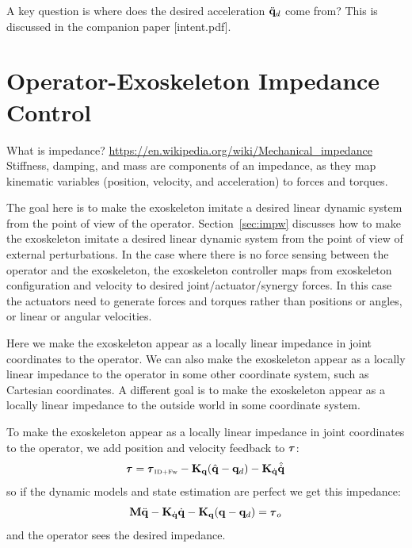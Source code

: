 \documentclass[letterpaper,12pt,fullpage]{article}
\newcommand{\invdynw}{{\mbox {\tiny ID+Fw}}}
\begin{document}
A key question is where does the desired acceleration $\ddot{{\bf q}}_d$ come from?
This is discussed in the companion paper [intent.pdf].

\section{Operator-Exoskeleton Impedance Control}

What is impedance?
\url{https://en.wikipedia.org/wiki/Mechanical_impedance}
Stiffness, damping, and mass are components of an impedance, as
they map kinematic variables (position, velocity, and acceleration)
to forces and torques.

The goal here is to make the exoskeleton imitate a desired linear dynamic system
from the point of view of the operator.
Section~\ref{sec:impw} discusses how to make the exoskeleton 
imitate a desired linear dynamic system 
from the point of view of external perturbations.
In the case where there is no force sensing between the operator and the
exoskeleton, the exoskeleton controller maps from exoskeleton configuration
and velocity to desired joint/actuator/synergy forces.
In this case the actuators need to generate forces and torques rather than
positions or angles, or linear or angular velocities.

Here we make the exoskeleton appear as a locally linear impedance in joint
coordinates to the operator.
We can also make the exoskeleton appear as a locally linear impedance to the
operator in some other coordinate system, such as Cartesian coordinates.
A different goal is to make the exoskeleton appear as a locally linear impedance to
the outside world in some coordinate system.

To make the exoskeleton appear as a locally linear impedance in joint
coordinates to the operator, we add position and velocity feedback to $\vtau$:
\begin{equation}
\vtau = \vtau_{\invdynw} - \mK_{\vq} ( \hat{\vq} - \vq_d ) - \mK_{\dot{\vq}} \hat{\dot{\vq}}
\label{eq:impedance}
\end{equation}
so if the dynamic models and state estimation are perfect we get this impedance:
\begin{equation}
\mM \ddot{\vq} - \mK_{\dot{\vq}} \dot{\vq} - \mK_{\vq} ( \vq - \vq_d ) = \vtau_o
\end{equation}
and the operator sees the desired impedance.
\end{document}

